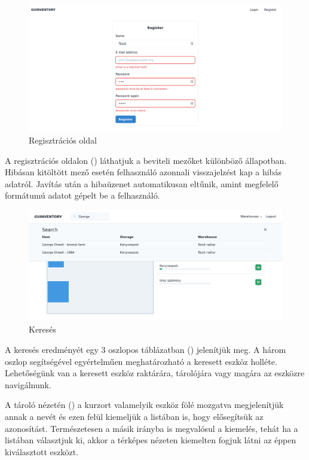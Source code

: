 \begin{figure}[!ht]
  \centering
  \includegraphics[width=150mm, keepaspectratio]{figures/reg.png}
  \caption{Regisztrációs oldal}
  \label{fig:reg}
\end{figure}

A regisztrációs oldalon () láthatjuk a beviteli mezőket különböző állapotban.
Hibásan kitöltött mező esetén felhasználó azonnali visszajelzést kap a hibás adatról.
Javítás után a hibaüzenet automatikusan eltűnik, amint megfelelő formátumú adatot gépelt be a felhasználó.

\begin{figure}[!ht]
  \centering
  \includegraphics[width=150mm, keepaspectratio]{figures/search.png}
  \caption{Keresés}
  \label{fig:search}
\end{figure}

A keresés eredményét egy 3 oszlopos táblázatban () jelenítjük meg.
A három oszlop segítségével egyértelműen meghatározható a keresett eszköz holléte.
Lehetőségünk van a keresett eszköz raktárára, tárolójára vagy magára az eszközre navigálnunk.

A tároló nézetén () a kurzort valamelyik eszköz fölé mozgatva megjelenítjük annak a nevét és ezen felül kiemeljük a listában is, hogy elősegítsük az azonosítást.
Természetesen a másik irányba is megvalósul a kiemelés, tehát ha a listában választjuk ki, akkor a térképes nézeten kiemelten fogjuk látni az éppen kiválasztott eszközt.

